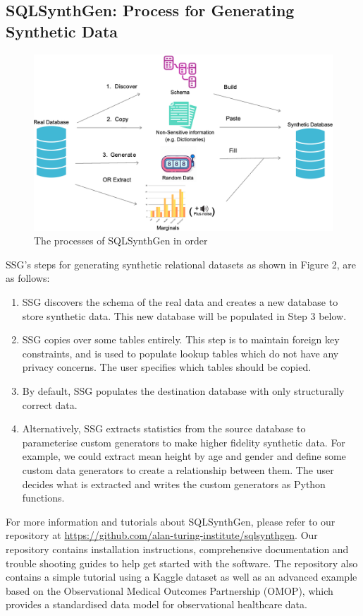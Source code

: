 \documentclass[11pt]{article}
\begin{document}
\subsection{SQLSynthGen: Process for Generating Synthetic Data}

\begin{figure}[ht]
\centering
\includegraphics[width=0.8\linewidth]{figures/SSG.png}
\caption{The processes of SQLSynthGen in order}
\label{fig:Range of fidelity for synthetic data}
\end{figure}

SSG's steps for generating synthetic relational datasets as shown in Figure 2, are as follows:

\begin{enumerate}
    \item SSG discovers the schema of the real data and creates a new database to store synthetic data. This new database will be populated in Step 3 below. 
    \item SSG copies over some tables entirely. This step is to maintain foreign key constraints, and is used to populate lookup tables which do not have any privacy concerns. The user specifies which tables should be copied.
    \item By default, SSG populates the destination database with only structurally correct data. \item Alternatively, SSG extracts statistics from the source database to parameterise custom generators to make higher fidelity synthetic data. For example, we could extract mean height by age and gender and define some custom data generators to create a relationship between them. The user decides what is extracted and writes the custom generators as Python functions.
\end{enumerate}

For more information and tutorials about SQLSynthGen, please refer to our repository at \url{https://github.com/alan-turing-institute/sqlsynthgen}. Our repository \cite{repository} contains installation instructions, comprehensive documentation and trouble shooting guides to help get started with the software. The repository also contains a simple tutorial using a Kaggle dataset \cite{airbnb} as well as an advanced example based on the Observational Medical Outcomes Partnership (OMOP)\cite{omop}, which provides a standardised data model for observational healthcare data. 
\end{document}
